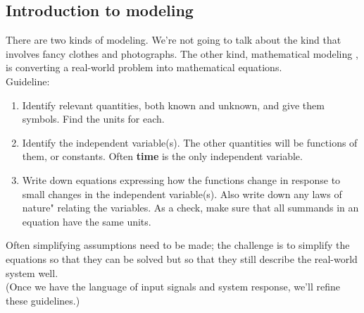 \subsection{Introduction to modeling}
There are two kinds of modeling.
We're not going to talk about the kind that involves fancy clothes and photographs.
The other kind, mathematical modeling , is converting a real-world problem into mathematical equations.\\
Guideline: 
\begin{enumerate}
\item Identify relevant quantities, both known and unknown, and give them symbols. Find the units for each.
\item Identify the independent variable(s).
  The other quantities will be functions of them, or constants. Often \textbf{time} is the only independent variable.
\item Write down equations expressing how the functions change in response to small changes in the independent variable(s).
  Also write down any laws of nature" relating the variables.
  As a check, make sure that all summands in an equation have the same units.
\end{enumerate}
Often simplifying assumptions need to be made;
the challenge is to simplify the equations so that they can be solved but so that they still describe the real-world system well.\\
(Once we have the language of input signals and system response, we'll refine these guidelines.)
